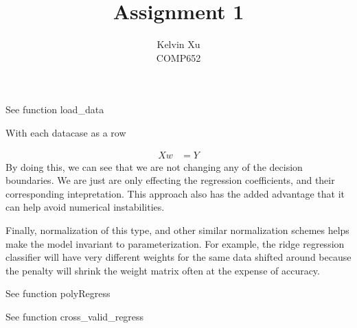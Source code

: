\documentclass[12pt]{article}
\newenvironment{problem}[2][Problem]{\begin{trivlist}
\item[\hskip \labelsep {\bfseries #1}\hskip \labelsep {\bfseries #2.}]}{\end{trivlist}}
\begin{document}

\title{Assignment 1}%
\author{Kelvin Xu\\ %
COMP652} %

\maketitle
\begin{problem}{1. (a)}
See function load\_data
\end{problem}

\begin{problem}{1. (b)}
With each datacase as a row
\end{problem}
\begin{align*}
    Xw &= Y 
\end{align*}
By doing this, we can see that we are not changing any of the decision
boundaries. We are just are only effecting the regression coefficients, and
their corresponding intepretation. This approach also has the added advantage
that it can help avoid numerical instabilities.

Finally, normalization of this type, and other similar normalization schemes
helps make the model invariant to parameterization. For example, the ridge
regression classifier will have very different weights for the same data
shifted around because the penalty will shrink the weight matrix
often at the expense of accuracy. 

\begin{problem}{1. (c)}
See function polyRegress 
\end{problem}

\begin{problem}{1. (d)}
See function cross\_valid\_regress 
\end{problem}

\begin{problem}{1. (e)}
\end{problem}

\begin{problem}{1. (f)}
\end{problem}
\end{document}

